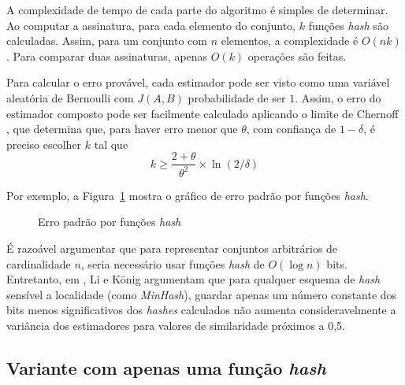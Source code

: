 A complexidade de tempo de cada parte do algoritmo é simples de determinar. Ao computar a assinatura, para cada elemento do conjunto, $k$ funções \emph{hash} são calculadas. Assim, para um conjunto com $n$ elementos, a complexidade é $O(nk)$. Para comparar duas assinaturas, apenas $O(k)$ operações são feitas.

Para calcular o erro provável, cada estimador pode ser visto como uma variável aleatória de Bernoulli com $J(A, B)$ probabilidade de ser $1$. Assim, o erro do estimador composto pode ser facilmente calculado aplicando o limite de Chernoff \cite{cohen2001finding,teixeira2012min}, que determina que, para haver erro menor que $\theta$, com confiança de $1-\delta$, é preciso escolher $k$ tal que 
\[
    k \geq \frac{2+\theta}{\theta^2} \times \ln(2/\delta)
\]

Por exemplo, a Figura~\ref{fig:min:prob} mostra o gráfico de erro padrão por funções \emph{hash}.

\begin{figure}[!htbp]
\centering
{}
\caption{Erro padrão por funções \emph{hash}}
\label{fig:min:prob}
\end{figure}

É razoável argumentar que para representar conjuntos arbitrários de cardinalidade $n$, seria necessário usar funções \emph{hash} de $O(\log n)$ bits. Entretanto, em \cite{b-bit-minwise-hashing}, Li e König argumentam que para qualquer esquema de \emph{hash} sensível a localidade (como \emph{MinHash}), guardar apenas um número constante dos bits menos significativos dos \emph{hashes} calculados não aumenta consideravelmente a variância dos estimadores para valores de similaridade próximos a 0,5.

\subsection{Variante com apenas uma função \emph{hash}}

